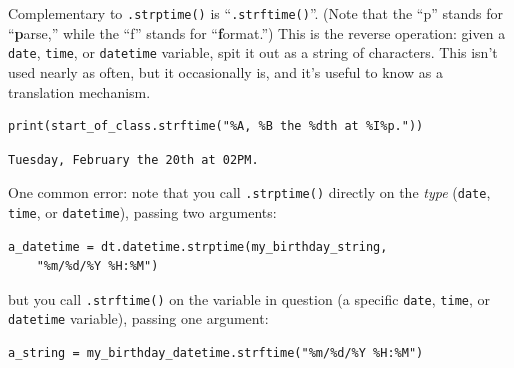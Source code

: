 Complementary to \texttt{.strptime()} is ``\texttt{.strftime()}''. (Note that
the ``p'' stands for ``\textbf{p}arse,'' while the ``f'' stands for
``\textbf{f}ormat.'') This is the reverse operation: given a \texttt{date},
\texttt{time}, or \texttt{datetime} variable, spit it out as a string of
characters. This isn't used nearly as often, but it occasionally is, and it's
useful to know as a translation mechanism.

\begin{Verbatim}[fontsize=\small,samepage=true,frame=single,framesep=3mm]
print(start_of_class.strftime("%A, %B the %dth at %I%p."))
\end{Verbatim}
\vspace{-.2in}

\begin{Verbatim}[fontsize=\small,samepage=true,frame=leftline,framesep=5mm,framerule=1mm]
Tuesday, February the 20th at 02PM.
\end{Verbatim}

One common error: note that you call \texttt{.strptime()} directly on the
\textit{type} (\texttt{date}, \texttt{time}, or \texttt{datetime}), passing
two arguments:

\begin{Verbatim}[fontsize=\small,samepage=true,frame=single,framesep=3mm]
a_datetime = dt.datetime.strptime(my_birthday_string,
    "%m/%d/%Y %H:%M")
\end{Verbatim}

but you call \texttt{.strftime()} on the variable in question (a specific
\texttt{date}, \texttt{time}, or \texttt{datetime} variable), passing one
argument:

\begin{Verbatim}[fontsize=\small,samepage=true,frame=single,framesep=3mm]
a_string = my_birthday_datetime.strftime("%m/%d/%Y %H:%M")
\end{Verbatim}